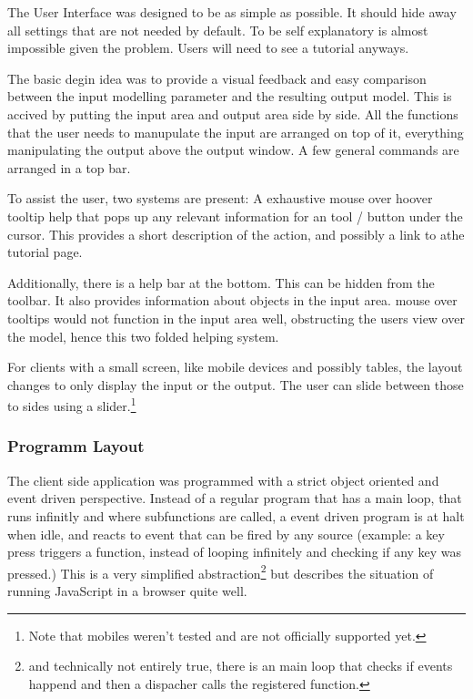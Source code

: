 The User Interface was designed to be as simple as possible.
It should hide away all settings that are not needed by default.
To be self explanatory is almost impossible given the problem.
Users will need to see a tutorial anyways.

The basic degin idea was to provide a visual feedback and easy comparison between the input modelling parameter and the resulting output model.
This is accived by putting the input area and output area side by side.
All the functions that the user needs to manupulate the input are arranged on top of it, everything manipulating the output above the output window.
A few general commands are arranged in a top bar.

To assist the user, two systems are present: A exhaustive mouse over hoover tooltip help that pops up any relevant information for an tool / button under the cursor.
This provides a short description of the action, and possibly a link to athe tutorial page.

Additionally, there is a help bar at the bottom. This can be hidden from the toolbar.
It also provides information about objects in the input area.
mouse over tooltips would not function in the input area well, obstructing the users view over the model, hence this two folded helping system.

For clients with a small screen, like mobile devices and possibly tables, the layout changes to only display the input or the output. The user can slide between those to sides using a slider.\footnote{Note that mobiles weren't tested and are not officially supported yet.}


\subsubsection{Programm Layout}
\label{sec:client_prog_layout}

The client side application was programmed with a strict object oriented and event driven perspective.
Instead of a regular program that has a main loop, that runs infinitly and where subfunctions are called, a event driven program is at halt when idle, and reacts to event that can be fired by any source (example: a key press triggers a function, instead of looping infinitely and checking if any key was pressed.)
This is a very simplified abstraction\footnote{and technically not entirely true, there is an main loop that checks if events happend and then a dispacher calls the registered function.} but describes the situation of running JavaScript in a browser quite well.

